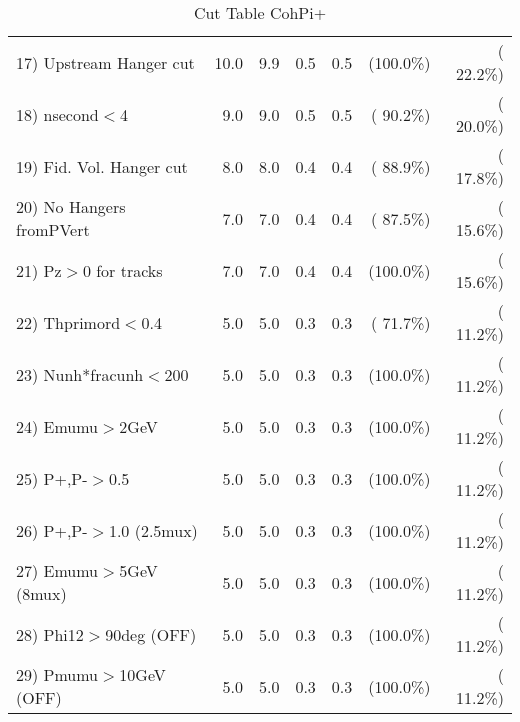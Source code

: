 \begin{table}[h!]
\begin{tabular}{||l||r|r|r|r|r|r||}
 17) Upstream Hanger cut  &         10.0 &          9.9 &          0.5 &          0.5 & (100.0\%) & ( 22.2\%) \\
 18) nsecond$<$4          &          9.0 &          9.0 &          0.5 &          0.5 & ( 90.2\%) & ( 20.0\%) \\
 19) Fid. Vol. Hanger cut &          8.0 &          8.0 &          0.4 &          0.4 & ( 88.9\%) & ( 17.8\%) \\
 20) No Hangers fromPVert &          7.0 &          7.0 &          0.4 &          0.4 & ( 87.5\%) & ( 15.6\%) \\
 21) Pz$>$0 for tracks    &          7.0 &          7.0 &          0.4 &          0.4 & (100.0\%) & ( 15.6\%) \\
 22) Thprimord$<$0.4      &          5.0 &          5.0 &          0.3 &          0.3 & ( 71.7\%) & ( 11.2\%) \\
 23) Nunh*fracunh$<$200   &          5.0 &          5.0 &          0.3 &          0.3 & (100.0\%) & ( 11.2\%) \\
 24) Emumu$>$2GeV         &          5.0 &          5.0 &          0.3 &          0.3 & (100.0\%) & ( 11.2\%) \\
 25) P+,P-$>$0.5          &          5.0 &          5.0 &          0.3 &          0.3 & (100.0\%) & ( 11.2\%) \\
 26) P+,P-$>$1.0 (2.5mux) &          5.0 &          5.0 &          0.3 &          0.3 & (100.0\%) & ( 11.2\%) \\
 27) Emumu$>$5GeV  (8mux) &          5.0 &          5.0 &          0.3 &          0.3 & (100.0\%) & ( 11.2\%) \\
 28) Phi12$>$90deg  (OFF) &          5.0 &          5.0 &          0.3 &          0.3 & (100.0\%) & ( 11.2\%) \\
 29) Pmumu$>$10GeV  (OFF) &          5.0 &          5.0 &          0.3 &          0.3 & (100.0\%) & ( 11.2\%) \\
 \hline
 \hline
 \end{tabular}
 \caption{Cut Table  CohPi+   }
 \label{tab-cutcohjpsi-mumu_nuecc}
 \end{table}

